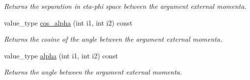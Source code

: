 \begin{DoxyCompactItemize}
\begin{DoxyCompactList}\small\item\em Returns the separation in eta-\/phi space between the argument external momenta. \end{DoxyCompactList}\item 
\hypertarget{a00442_a4dfb607cc3cb4c1844c5b4563d12eed1}{value\-\_\-type \hyperlink{a00442_a4dfb607cc3cb4c1844c5b4563d12eed1}{cos\-\_\-alpha} (int i1, int i2) const }\label{a00442_a4dfb607cc3cb4c1844c5b4563d12eed1}

\begin{DoxyCompactList}\small\item\em Returns the cosine of the angle between the argument external momenta. \end{DoxyCompactList}\item 
\hypertarget{a00442_a3d3dfd9f1aed794d5c6b57b877de5beb}{value\-\_\-type \hyperlink{a00442_a3d3dfd9f1aed794d5c6b57b877de5beb}{alpha} (int i1, int i2) const }\label{a00442_a3d3dfd9f1aed794d5c6b57b877de5beb}

\begin{DoxyCompactList}\small\item\em Returns the angle between the argument external momenta. \end{DoxyCompactList}\end{DoxyCompactItemize}

